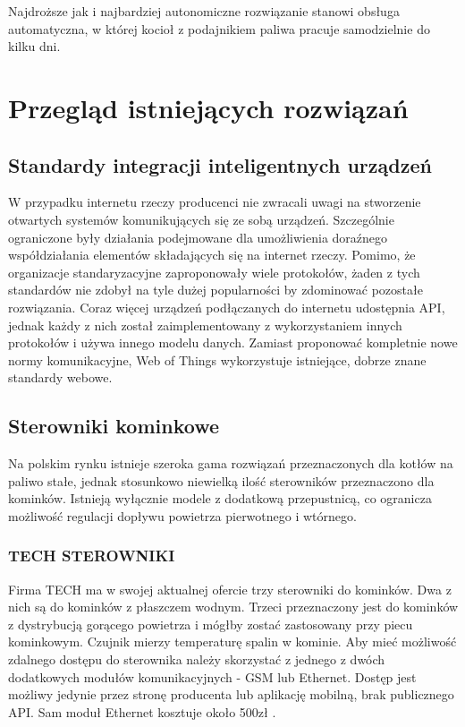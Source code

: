 \documentclass[11pt]{report}
\begin{document}
 Najdroższe jak i najbardziej autonomiczne rozwiązanie stanowi obsługa automatyczna, w której kocioł z podajnikiem paliwa pracuje samodzielnie do kilku dni.
 
 
 \chapter{Przegląd istniejących rozwiązań} 
 \section{Standardy integracji inteligentnych urządzeń}
 W przypadku internetu rzeczy producenci nie zwracali uwagi na stworzenie otwartych systemów komunikujących się ze sobą urządzeń. Szczególnie ograniczone były działania  podejmowane dla umożliwienia doraźnego współdziałania elementów składających się na internet rzeczy. Pomimo, że organizacje standaryzacyjne zaproponowały wiele protokołów, żaden z tych standardów nie zdobył na tyle dużej popularności by zdominować pozostałe rozwiązania. Coraz więcej urządzeń podłączanych do internetu udostępnia API, jednak każdy z nich został zaimplementowany z wykorzystaniem innych protokołów i używa innego modelu danych. Zamiast proponować kompletnie nowe normy komunikacyjne, Web of Things wykorzystuje istniejące, dobrze znane standardy webowe.
  
 \section{Sterowniki kominkowe}
 Na polskim rynku istnieje szeroka gama rozwiązań przeznaczonych dla kotłów na paliwo stałe, jednak stosunkowo niewielką ilość sterowników przeznaczono dla kominków. Istnieją wyłącznie modele z dodatkową przepustnicą, co ogranicza możliwość regulacji dopływu powietrza pierwotnego i wtórnego.
 \subsection{TECH STEROWNIKI}
 Firma TECH ma w swojej aktualnej ofercie \cite{Tech} trzy sterowniki do kominków. Dwa z nich są do kominków z płaszczem wodnym. Trzeci \cite{TechSterownik} przeznaczony jest do kominków z dystrybucją gorącego powietrza i mógłby zostać zastosowany przy piecu kominkowym. Czujnik mierzy temperaturę spalin w kominie.
 Aby mieć możliwość zdalnego dostępu do sterownika należy skorzystać z jednego z dwóch dodatkowych modułów komunikacyjnych - GSM lub Ethernet. Dostęp jest możliwy jedynie przez stronę producenta lub aplikację mobilną, brak publicznego API.
 Sam moduł Ethernet kosztuje około 500zł \cite{TechEthernetCena}.
\end{document}
